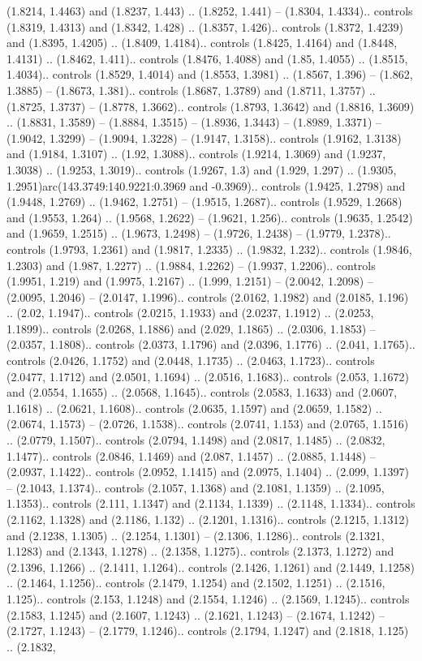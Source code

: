 (1.8214, 1.4463) and (1.8237, 1.443) .. (1.8252, 1.441) -- (1.8304, 1.4334).. controls (1.8319, 1.4313) and (1.8342, 1.428) .. (1.8357, 1.426).. controls (1.8372, 1.4239) and (1.8395, 1.4205) .. (1.8409, 1.4184).. controls (1.8425, 1.4164) and (1.8448, 1.4131) .. (1.8462, 1.411).. controls (1.8476, 1.4088) and (1.85, 1.4055) .. (1.8515, 1.4034).. controls (1.8529, 1.4014) and (1.8553, 1.3981) .. (1.8567, 1.396) -- (1.862, 1.3885) -- (1.8673, 1.381).. controls (1.8687, 1.3789) and (1.8711, 1.3757) .. (1.8725, 1.3737) -- (1.8778, 1.3662).. controls (1.8793, 1.3642) and (1.8816, 1.3609) .. (1.8831, 1.3589) -- (1.8884, 1.3515) -- (1.8936, 1.3443) -- (1.8989, 1.3371) -- (1.9042, 1.3299) -- (1.9094, 1.3228) -- (1.9147, 1.3158).. controls (1.9162, 1.3138) and (1.9184, 1.3107) .. (1.92, 1.3088).. controls (1.9214, 1.3069) and (1.9237, 1.3038) .. (1.9253, 1.3019).. controls (1.9267, 1.3) and (1.929, 1.297) .. (1.9305, 1.2951)arc(143.3749:140.9221:0.3969 and -0.3969).. controls (1.9425, 1.2798) and (1.9448, 1.2769) .. (1.9462, 1.2751) -- (1.9515, 1.2687).. controls (1.9529, 1.2668) and (1.9553, 1.264) .. (1.9568, 1.2622) -- (1.9621, 1.256).. controls (1.9635, 1.2542) and (1.9659, 1.2515) .. (1.9673, 1.2498) -- (1.9726, 1.2438) -- (1.9779, 1.2378).. controls (1.9793, 1.2361) and (1.9817, 1.2335) .. (1.9832, 1.232).. controls (1.9846, 1.2303) and (1.987, 1.2277) .. (1.9884, 1.2262) -- (1.9937, 1.2206).. controls (1.9951, 1.219) and (1.9975, 1.2167) .. (1.999, 1.2151) -- (2.0042, 1.2098) -- (2.0095, 1.2046) -- (2.0147, 1.1996).. controls (2.0162, 1.1982) and (2.0185, 1.196) .. (2.02, 1.1947).. controls (2.0215, 1.1933) and (2.0237, 1.1912) .. (2.0253, 1.1899).. controls (2.0268, 1.1886) and (2.029, 1.1865) .. (2.0306, 1.1853) -- (2.0357, 1.1808).. controls (2.0373, 1.1796) and (2.0396, 1.1776) .. (2.041, 1.1765).. controls (2.0426, 1.1752) and (2.0448, 1.1735) .. (2.0463, 1.1723).. controls (2.0477, 1.1712) and (2.0501, 1.1694) .. (2.0516, 1.1683).. controls (2.053, 1.1672) and (2.0554, 1.1655) .. (2.0568, 1.1645).. controls (2.0583, 1.1633) and (2.0607, 1.1618) .. (2.0621, 1.1608).. controls (2.0635, 1.1597) and (2.0659, 1.1582) .. (2.0674, 1.1573) -- (2.0726, 1.1538).. controls (2.0741, 1.153) and (2.0765, 1.1516) .. (2.0779, 1.1507).. controls (2.0794, 1.1498) and (2.0817, 1.1485) .. (2.0832, 1.1477).. controls (2.0846, 1.1469) and (2.087, 1.1457) .. (2.0885, 1.1448) -- (2.0937, 1.1422).. controls (2.0952, 1.1415) and (2.0975, 1.1404) .. (2.099, 1.1397) -- (2.1043, 1.1374).. controls (2.1057, 1.1368) and (2.1081, 1.1359) .. (2.1095, 1.1353).. controls (2.111, 1.1347) and (2.1134, 1.1339) .. (2.1148, 1.1334).. controls (2.1162, 1.1328) and (2.1186, 1.132) .. (2.1201, 1.1316).. controls (2.1215, 1.1312) and (2.1238, 1.1305) .. (2.1254, 1.1301) -- (2.1306, 1.1286).. controls (2.1321, 1.1283) and (2.1343, 1.1278) .. (2.1358, 1.1275).. controls (2.1373, 1.1272) and (2.1396, 1.1266) .. (2.1411, 1.1264).. controls (2.1426, 1.1261) and (2.1449, 1.1258) .. (2.1464, 1.1256).. controls (2.1479, 1.1254) and (2.1502, 1.1251) .. (2.1516, 1.125).. controls (2.153, 1.1248) and (2.1554, 1.1246) .. (2.1569, 1.1245).. controls (2.1583, 1.1245) and (2.1607, 1.1243) .. (2.1621, 1.1243) -- (2.1674, 1.1242) -- (2.1727, 1.1243) -- (2.1779, 1.1246).. controls (2.1794, 1.1247) and (2.1818, 1.125) .. (2.1832, 